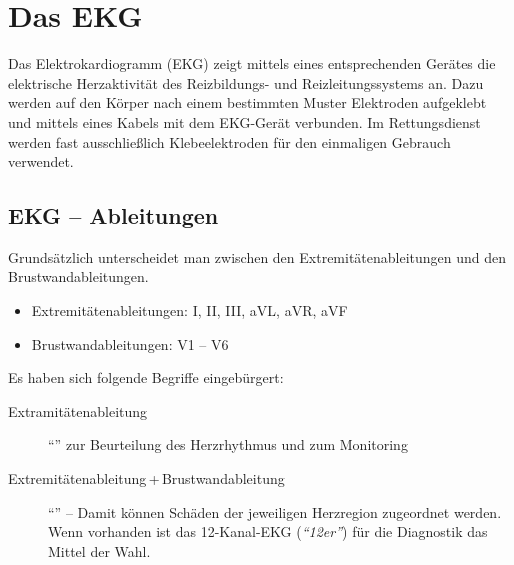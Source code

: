 \section{Das EKG}

Das Elektrokardiogramm (EKG) zeigt mittels eines entsprechenden
Ger\"ates die elektrische Herzaktivit\"at des
Reizbildungs- und Reizleitungssystems an. Dazu werden auf
den K\"orper nach einem bestimmten Muster Elektroden
aufgeklebt und mittels eines Kabels mit dem EKG-Ger\"at
verbunden. Im Rettungsdienst werden fast ausschließlich
Klebeelektroden für den einmaligen Gebrauch verwendet. 

 



\subsection{EKG -- Ableitungen}
Grunds\"atzlich unterscheidet man zwischen den Extremit\"atenableitungen
und den Brustwandableitungen. 

\begin{itemize}
    \item Extremit\"atenableitungen: I, II, III, aVL, aVR, aVF
    \item Brustwandableitungen: V1 -- V6
\end{itemize}

Es haben sich folgende Begriffe eingebürgert:

\begin{description}
    \item[Extramitätenableitung] "`"'
    zur Beurteilung des Herzrhythmus und zum Monitoring
    \item[Extremitätenableitung\,+\,Brustwandableitung]
    "`"' -- Damit können Schäden der
    jeweiligen Herzregion zugeordnet werden. Wenn vorhanden
    ist das 12-Kanal-EKG (\emph{"`12er"'}) für die
    Diagnostik das Mittel der Wahl. 
\end{description}

